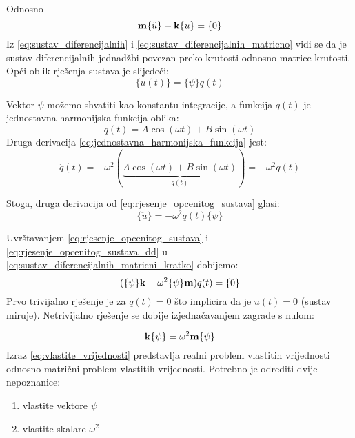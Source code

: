 Odnosno
\begin{equation}\label{eq:sustav_diferencijalnih_matricni_kratko}
    \mathbf{m}\{\ddot{u}\}+\mathbf{k}\{u\}=\{0\}
\end{equation}
Iz \eqref{eq:sustav_diferencijalnih} i \eqref{eq:sustav_diferencijalnih_matricno}
vidi se da je sustav diferencijalnih jednadžbi povezan preko krutosti odnosno
matrice krutosti. Opći oblik rješenja sustava je slijedeći:
\begin{equation}\label{eq:rjesenje_opcenitog_sustava}
    \{u(t)\} = \{\psi\}q(t)
\end{equation}

Vektor $\psi$ možemo shvatiti kao konstantu integracije, a funkcija $q(t)$ je
jednostavna harmonijska funkcija oblika:
\begin{equation}\label{eq:jednostavna_harmonijska_funkcija}
    q(t)=A\cos(\omega t) + B\sin(\omega t)
\end{equation}
Druga derivacija \eqref{eq:jednostavna_harmonijska_funkcija} jest:
\begin{equation}\label{eq:jednostavna_harmonijska_funkcija_dd}
    \ddot{q}(t)=-\omega^2(
    \underbrace{
        A\cos(\omega t) + B\sin(\omega t)
    }_{\text{$q(t)$}}
    )
    =-\omega^2q(t)
\end{equation}

Stoga, druga derivacija od \eqref{eq:rjesenje_opcenitog_sustava} glasi:
\begin{equation}\label{eq:rjesenje_opcenitog_sustava_dd}
    \{\ddot{u}\}=-\omega^2q(t)\{\psi\}
\end{equation}

Uvrštavanjem \eqref{eq:rjesenje_opcenitog_sustava} i \eqref{eq:rjesenje_opcenitog_sustava_dd}
u \eqref{eq:sustav_diferencijalnih_matricni_kratko} dobijemo:
\begin{equation}
    (\{\psi\}\mathbf{k}-\omega^2\{\psi\}\mathbf{m})q(t)=\{0\}
\end{equation}
Prvo trivijalno rješenje je za $q(t)=0$ što implicira da je $u(t)=0$ (sustav
miruje). Netrivijalno rješenje se dobije izjednačavanjem zagrade s nulom:

\begin{equation}\label{eq:vlastite_vrijednosti}
    \mathbf{k}\{\psi\}=\omega^2\mathbf{m}\{\psi\}
\end{equation}
Izraz \eqref{eq:vlastite_vrijednosti} predstavlja realni problem vlastitih
vrijednosti odnosno matrični problem vlastitih vrijednosti. Potrebno je odrediti
dvije nepoznanice: 
\begin{enumerate}
    \item vlastite vektore $\psi$
    \item vlastite skalare $\omega^2$
\end{enumerate}


